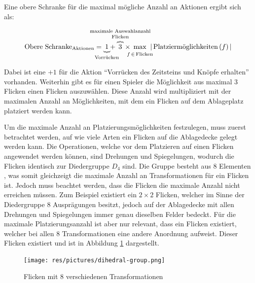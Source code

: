 Eine obere Schranke für die maximal mögliche Anzahl an Aktionen ergibt sich als:

\vspace*{-0.45cm}
\begin{equation}
    \text{Obere Schranke}_{\text{Aktionen}} = \:
    \underset{\mathclap{\substack{\rotatebox[origin=c]{90}{\(\{ \)} \mathstrut \\ \text{Vorrücken}}}}{1}
    + \:
    \overset{\mathclap{\substack{\text{maximale Auswahlanzahl} \mathstrut \\ \text{Flicken} \mathstrut \\ \rotatebox[origin=c]{-90}{\(\{ \)}}}}{3} \:
    \times \:
    \max\limits_{\mathclap{\substack{\phantom{\text{\tiny m}} \\ f\, \in\, \text{Flicken}}}} \:\,
    \left\lvert\, \text{Platziermöglichkeiten}\left( f \right)\, \right\rvert
\end{equation}
\vspace*{-0.15cm}

Dabei ist eine $+1$ für die Aktion \enquote{Vorrücken des Zeitsteins und Knöpfe erhalten} vorhanden. Weiterhin gibt es für einen Spieler die Möglichkeit aus maximal 3 Flicken einen Flicken auszuwählen. Diese Anzahl wird multipliziert mit der maximalen Anzahl an Möglichkeiten, mit dem ein Flicken auf dem Ablageplatz platziert werden kann.

Um die maximale Anzahl an Platzierungsmöglichkeiten festzulegen, muss zuerst betrachtet werden, auf wie viele Arten ein Flicken auf die Ablagedecke gelegt werden kann. Die Operationen, welche vor dem Platzieren auf einen Flicken angewendet werden können, sind Drehungen und Spiegelungen, wodurch die Flicken identisch zur Diedergruppe $D_4$ sind. Die Gruppe besteht aus 8 Elementen \cite[S. 33]{2015.AbstractAlgebra}, was somit gleichzeigt die maximale Anzahl an Transformationen für ein Flicken ist. Jedoch muss beachtet werden, dass die Flicken die maximale Anzahl nicht erreichen müssen. Zum Beispiel existiert ein $2\times2$ Flicken, welcher im Sinne der Diedergruppe 8 Ausprägungen besitzt, jedoch auf der Ablagedecke mit allen Drehungen und Spiegelungen immer genau dieselben Felder bedeckt. Für die maximale Platzierungsanzahl ist aber nur relevant, dass ein Flicken existiert, welcher bei allen 8 Transformationen eine andere Anordnung aufweist. Dieser Flicken existiert und ist in Abbildung \ref{fig:diedergruppe} dargestellt.

\pagebreak

\vspace*{-0.85cm}
\begin{figure}[!ht]
    \centering
    \texttt{[image: res/pictures/dihedral-group.png]}
    \vspace*{-0.23cm}
    \caption{Flicken mit 8 verschiedenen Transformationen}
    \label{fig:diedergruppe}
    \vspace*{-0.22cm}
\end{figure}

